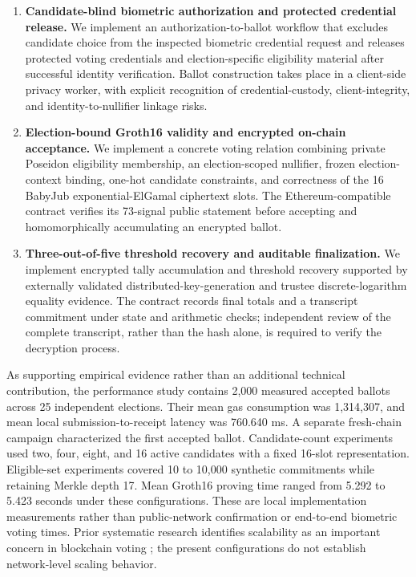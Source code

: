 \begin{enumerate}
\item \textbf{Candidate-blind biometric authorization and protected credential release.} We implement an authorization-to-ballot workflow that excludes candidate choice from the inspected biometric credential request and releases protected voting credentials and election-specific eligibility material after successful identity verification. Ballot construction takes place in a client-side privacy worker, with explicit recognition of credential-custody, client-integrity, and identity-to-nullifier linkage risks.

\item \textbf{Election-bound Groth16 validity and encrypted on-chain acceptance.} We implement a concrete voting relation combining private Poseidon eligibility membership, an election-scoped nullifier, frozen election-context binding, one-hot candidate constraints, and correctness of the 16 BabyJub exponential-ElGamal ciphertext slots. The Ethereum-compatible contract verifies its 73-signal public statement before accepting and homomorphically accumulating an encrypted ballot.

\item \textbf{Three-out-of-five threshold recovery and auditable finalization.} We implement encrypted tally accumulation and threshold recovery supported by externally validated distributed-key-generation and trustee discrete-logarithm equality evidence. The contract records final totals and a transcript commitment under state and arithmetic checks; independent review of the complete transcript, rather than the hash alone, is required to verify the decryption process.
\end{enumerate}

As supporting empirical evidence rather than an additional technical contribution, the performance study contains 2,000 measured accepted ballots across 25 independent elections. Their mean gas consumption was 1,314,307, and mean local submission-to-receipt latency was 760.640 ms. A separate fresh-chain campaign characterized the first accepted ballot. Candidate-count experiments used two, four, eight, and 16 active candidates with a fixed 16-slot representation. Eligible-set experiments covered 10 to 10,000 synthetic commitments while retaining Merkle depth 17. Mean Groth16 proving time ranged from 5.292 to 5.423 seconds under these configurations. These are local implementation measurements rather than public-network confirmation or end-to-end biometric voting times. Prior systematic research identifies scalability as an important concern in blockchain voting \citep{jafar2022scalability}; the present configurations do not establish network-level scaling behavior.

